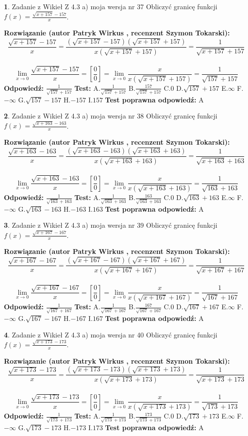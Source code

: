 \documentclass[12pt, a4paper]{article}
\theoremstyle{definition} %
\newtheorem{zad}{}
\newcommand{\zadStart}[1]{\begin{zad}#1\newline}
\newcommand{\zadStop}{\end{zad}}
\newcommand{\rozwStart}[2]{\noindent \textbf{Rozwiązanie (autor #1 , recenzent #2): }\newline}
\newcommand{\rozwStop}{\newline}
\newcommand{\odpStart}{\noindent \textbf{Odpowiedź:}\newline}
\newcommand{\odpStop}{\newline}
\newcommand{\testStart}{\noindent \textbf{Test:}\newline}
\newcommand{\testStop}{\newline}
\newcommand{\kluczStart}{\noindent \textbf{Test poprawna odpowiedź:}\newline}
\newcommand{\kluczStop}{\newline}
\begin{document}
\zadStart{Zadanie z Wikieł Z 4.3 a) moja wersja nr 37}
Obliczyć granicę funkcji $f(x)=\frac{\sqrt{x+157}-157}{x}$.
\zadStop
\rozwStart{Patryk Wirkus}{Szymon Tokarski}
$$\frac{\sqrt{x+157}-157}{x}=\frac{(\sqrt{x+157}-157)(\sqrt{x+157}+157)}{x(\sqrt{x+157}+157)}=\frac{1}{\sqrt{x+157}+157}$$
\\
$$\lim\limits_{x\to0}\frac{\sqrt{x+157}-157}{x}=[\frac{0}{0}]=
\lim\limits_{x\to0}\frac{x}{x(\sqrt{x+157}+157)} = \frac{1}{\sqrt{157}+157}$$
\rozwStop
\odpStart
$\frac{1}{\sqrt{157}+157}$
\odpStop
\testStart
A.$\frac{1}{\sqrt{157}+157}$
B.$\frac{157}{\sqrt{157}+157}$
C.$0$
D.$\sqrt{157}+157$
E.$\infty$
F.$-\infty$
G.$\sqrt{157}-157$
H.$-157$
I.$157$
\testStop
\kluczStart
A
\kluczStop



\zadStart{Zadanie z Wikieł Z 4.3 a) moja wersja nr 38}
Obliczyć granicę funkcji $f(x)=\frac{\sqrt{x+163}-163}{x}$.
\zadStop
\rozwStart{Patryk Wirkus}{Szymon Tokarski}
$$\frac{\sqrt{x+163}-163}{x}=\frac{(\sqrt{x+163}-163)(\sqrt{x+163}+163)}{x(\sqrt{x+163}+163)}=\frac{1}{\sqrt{x+163}+163}$$
\\
$$\lim\limits_{x\to0}\frac{\sqrt{x+163}-163}{x}=[\frac{0}{0}]=
\lim\limits_{x\to0}\frac{x}{x(\sqrt{x+163}+163)} = \frac{1}{\sqrt{163}+163}$$
\rozwStop
\odpStart
$\frac{1}{\sqrt{163}+163}$
\odpStop
\testStart
A.$\frac{1}{\sqrt{163}+163}$
B.$\frac{163}{\sqrt{163}+163}$
C.$0$
D.$\sqrt{163}+163$
E.$\infty$
F.$-\infty$
G.$\sqrt{163}-163$
H.$-163$
I.$163$
\testStop
\kluczStart
A
\kluczStop



\zadStart{Zadanie z Wikieł Z 4.3 a) moja wersja nr 39}
Obliczyć granicę funkcji $f(x)=\frac{\sqrt{x+167}-167}{x}$.
\zadStop
\rozwStart{Patryk Wirkus}{Szymon Tokarski}
$$\frac{\sqrt{x+167}-167}{x}=\frac{(\sqrt{x+167}-167)(\sqrt{x+167}+167)}{x(\sqrt{x+167}+167)}=\frac{1}{\sqrt{x+167}+167}$$
\\
$$\lim\limits_{x\to0}\frac{\sqrt{x+167}-167}{x}=[\frac{0}{0}]=
\lim\limits_{x\to0}\frac{x}{x(\sqrt{x+167}+167)} = \frac{1}{\sqrt{167}+167}$$
\rozwStop
\odpStart
$\frac{1}{\sqrt{167}+167}$
\odpStop
\testStart
A.$\frac{1}{\sqrt{167}+167}$
B.$\frac{167}{\sqrt{167}+167}$
C.$0$
D.$\sqrt{167}+167$
E.$\infty$
F.$-\infty$
G.$\sqrt{167}-167$
H.$-167$
I.$167$
\testStop
\kluczStart
A
\kluczStop



\zadStart{Zadanie z Wikieł Z 4.3 a) moja wersja nr 40}
Obliczyć granicę funkcji $f(x)=\frac{\sqrt{x+173}-173}{x}$.
\zadStop
\rozwStart{Patryk Wirkus}{Szymon Tokarski}
$$\frac{\sqrt{x+173}-173}{x}=\frac{(\sqrt{x+173}-173)(\sqrt{x+173}+173)}{x(\sqrt{x+173}+173)}=\frac{1}{\sqrt{x+173}+173}$$
\\
$$\lim\limits_{x\to0}\frac{\sqrt{x+173}-173}{x}=[\frac{0}{0}]=
\lim\limits_{x\to0}\frac{x}{x(\sqrt{x+173}+173)} = \frac{1}{\sqrt{173}+173}$$
\rozwStop
\odpStart
$\frac{1}{\sqrt{173}+173}$
\odpStop
\testStart
A.$\frac{1}{\sqrt{173}+173}$
B.$\frac{173}{\sqrt{173}+173}$
C.$0$
D.$\sqrt{173}+173$
E.$\infty$
F.$-\infty$
G.$\sqrt{173}-173$
H.$-173$
I.$173$
\testStop
\kluczStart
A
\kluczStop
\end{document}
